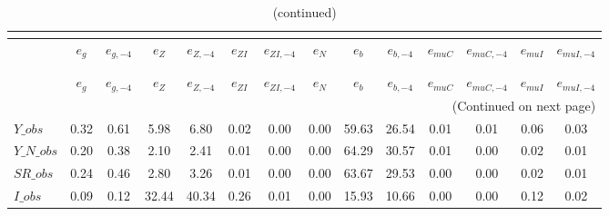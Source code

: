  
\begin{center}
\begin{longtable}{lccccccccccccc} 
\caption{VARIANCE DECOMPOSITION (in percent)}\\
 \label{Table:th_var_decomp_uncond}\\
\toprule 
$               $	 & 	 $           {e_g}$	 & 	 $      {e_{g,-4}}$	 & 	 $           {e_Z}$	 & 	 $      {e_{Z,-4}}$	 & 	 $        {e_{ZI}}$	 & 	 $     {e_{ZI,-4}}$	 & 	 $           {e_N}$	 & 	 $           {e_b}$	 & 	 $      {e_{b,-4}}$	 & 	 $       {e_{muC}}$	 & 	 $    {e_{muC,-4}}$	 & 	 $       {e_{muI}}$	 & 	 $    {e_{muI,-4}}$\\
\midrule \endfirsthead 
\caption{(continued)}\\
 \toprule \\ 
$               $	 & 	 $           {e_g}$	 & 	 $      {e_{g,-4}}$	 & 	 $           {e_Z}$	 & 	 $      {e_{Z,-4}}$	 & 	 $        {e_{ZI}}$	 & 	 $     {e_{ZI,-4}}$	 & 	 $           {e_N}$	 & 	 $           {e_b}$	 & 	 $      {e_{b,-4}}$	 & 	 $       {e_{muC}}$	 & 	 $    {e_{muC,-4}}$	 & 	 $       {e_{muI}}$	 & 	 $    {e_{muI,-4}}$\\
\midrule \endhead 
\midrule \multicolumn{14}{r}{(Continued on next page)} \\ \bottomrule \endfoot 
\bottomrule \endlastfoot 
$Y\_obs         $	 & 	            0.32	 & 	            0.61	 & 	            5.98	 & 	            6.80	 & 	            0.02	 & 	            0.00	 & 	            0.00	 & 	           59.63	 & 	           26.54	 & 	            0.01	 & 	            0.01	 & 	            0.06	 & 	            0.03 \\ 
$Y\_N\_obs      $	 & 	            0.20	 & 	            0.38	 & 	            2.10	 & 	            2.41	 & 	            0.01	 & 	            0.00	 & 	            0.00	 & 	           64.29	 & 	           30.57	 & 	            0.01	 & 	            0.00	 & 	            0.02	 & 	            0.01 \\ 
$SR\_obs        $	 & 	            0.24	 & 	            0.46	 & 	            2.80	 & 	            3.26	 & 	            0.01	 & 	            0.00	 & 	            0.00	 & 	           63.67	 & 	           29.53	 & 	            0.00	 & 	            0.00	 & 	            0.02	 & 	            0.01 \\ 
$I\_obs         $	 & 	            0.09	 & 	            0.12	 & 	           32.44	 & 	           40.34	 & 	            0.26	 & 	            0.01	 & 	            0.00	 & 	           15.93	 & 	           10.66	 & 	            0.00	 & 	            0.00	 & 	            0.12	 & 	            0.02 \\ 

\end{longtable}
\end{center}
